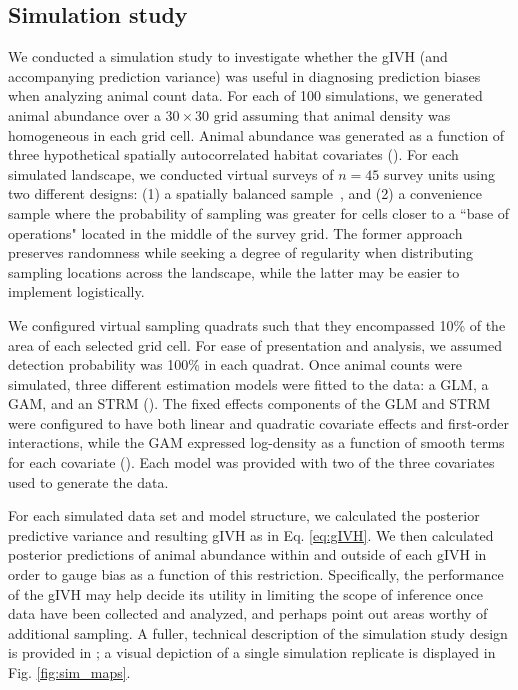 \documentclass[10pt,letterpaper]{article}
\begin{document}
\subsection*{Simulation study}


We conducted a simulation study to investigate whether the gIVH (and accompanying prediction variance) was useful in diagnosing prediction biases when analyzing animal count data. For each of 100 simulations, we generated animal abundance over a $30 \times 30$ grid assuming that animal density was homogeneous in each grid cell.  Animal abundance was generated as a function of three hypothetical spatially autocorrelated habitat covariates ().   For each simulated landscape, we conducted virtual surveys of $n=45$ survey units using two different designs: (1) a spatially balanced sample~\cite{StevensOlsen2004}, and (2) a convenience sample where the probability of sampling was greater for cells closer to a ``base of operations" located in the middle of the survey grid. The former approach preserves randomness while seeking a degree of regularity when distributing sampling locations across the landscape, while the latter may be easier to implement logistically.

We configured virtual sampling quadrats such that they encompassed 10\% of the area of each selected grid cell.  For ease of presentation and analysis, we assumed detection probability was 100\% in each quadrat.  Once animal counts were simulated, three different estimation models were fitted to the data: a GLM, a GAM, and an STRM ().  The fixed effects components of the GLM and STRM were configured to have both linear and quadratic covariate effects and first-order interactions, while the GAM expressed log-density as a function of smooth terms for each covariate ().  Each model was provided with two of the three covariates used to generate the data.

For each simulated data set and model structure, we calculated the posterior predictive variance and resulting gIVH as in Eq. \ref{eq:gIVH}. We then calculated posterior predictions of animal abundance within and outside of each gIVH in order to gauge bias as a function of this restriction.  Specifically, the performance of the gIVH may help decide its utility in limiting the scope of inference once data have been collected and analyzed, and perhaps point out areas worthy of additional sampling.  A fuller, technical description of the simulation study design is provided in ; a visual depiction of a single simulation replicate is displayed in
Fig. \ref{fig:sim_maps}.
\end{document}
